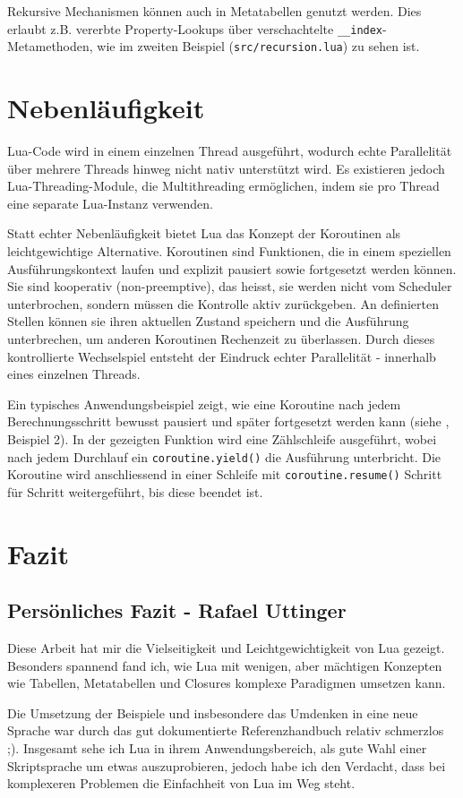 \documentclass[11pt,a4paper]{article}
\begin{document}
Rekursive Mechanismen können auch in Metatabellen genutzt werden. 
Dies erlaubt z.B. vererbte Property-Lookups über verschachtelte \texttt{\_\_index}-Metamethoden, wie im zweiten Beispiel (\texttt{src/recursion.lua}) zu sehen ist.

\section*{Nebenläufigkeit}

Lua-Code wird in einem einzelnen Thread ausgeführt, wodurch echte Parallelität über mehrere Threads hinweg nicht nativ unterstützt wird. 
Es existieren jedoch Lua-Threading-Module, die Multithreading ermöglichen, indem sie pro Thread eine separate Lua-Instanz verwenden.

Statt echter Nebenläufigkeit bietet Lua das Konzept der Koroutinen als leichtgewichtige Alternative. 
Koroutinen sind Funktionen, die in einem speziellen Ausführungskontext laufen und explizit pausiert sowie fortgesetzt werden können. 
Sie sind kooperativ (non-preemptive), das heisst, sie werden nicht vom Scheduler unterbrochen, sondern müssen die Kontrolle aktiv zurückgeben. 
An definierten Stellen können sie ihren aktuellen Zustand speichern und die Ausführung unterbrechen, um anderen Koroutinen Rechenzeit zu überlassen. 
Durch dieses kontrollierte Wechselspiel entsteht der Eindruck echter Parallelität - innerhalb eines einzelnen Threads.

Ein typisches Anwendungsbeispiel zeigt, wie eine Koroutine nach jedem Berechnungsschritt bewusst pausiert und später fortgesetzt werden kann (siehe , Beispiel 2). 
In der gezeigten Funktion wird eine Zählschleife ausgeführt, wobei nach jedem Durchlauf ein \lstinline|coroutine.yield()| die Ausführung unterbricht. 
Die Koroutine wird anschliessend in einer Schleife mit \lstinline|coroutine.resume()| Schritt für Schritt weitergeführt, bis diese beendet ist.

\section*{Fazit}

\subsection*{Persönliches Fazit - Rafael Uttinger}
Diese Arbeit hat mir die Vielseitigkeit und Leichtgewichtigkeit von Lua gezeigt. 
Besonders spannend fand ich, wie Lua mit wenigen, aber mächtigen Konzepten wie Tabellen, Metatabellen und Closures komplexe Paradigmen umsetzen kann. 

Die Umsetzung der Beispiele und insbesondere das Umdenken in eine neue Sprache war durch das gut dokumentierte Referenzhandbuch relativ schmerzlos ;). 
Insgesamt sehe ich Lua in ihrem Anwendungsbereich, als gute Wahl einer Skriptsprache um etwas auszuprobieren, jedoch habe ich den Verdacht, 
dass bei komplexeren Problemen die Einfachheit von Lua im Weg steht. 
\end{document}
